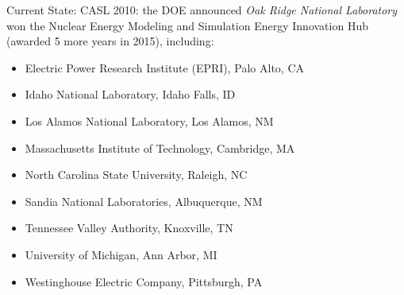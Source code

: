 \documentclass[xcolor=x11names,compress, handout]{beamer}
\renewcommand{\(}{\begin{columns}}
\renewcommand{\)}{\end{columns}}
\newcommand{\<}[1]{\begin{column}{#1}}
\renewcommand{\>}{\end{column}}
\begin{document}
%
%


\begin{frame}{Current State: CASL}
2010: the DOE announced \emph{Oak Ridge National Laboratory} won the Nuclear Energy Modeling and Simulation Energy Innovation Hub (awarded 5 more years in 2015), including:	
\begin{itemize}
\item Electric Power Research Institute (EPRI), Palo Alto, CA
\item Idaho National Laboratory, Idaho Falls, ID
\item Los Alamos National Laboratory, Los Alamos, NM
\item Massachusetts Institute of Technology, Cambridge, MA
\item North Carolina State University, Raleigh, NC
\item Sandia National Laboratories, Albuquerque, NM
\item Tennessee Valley Authority, Knoxville, TN
\item University of Michigan, Ann Arbor, MI
\item Westinghouse Electric Company, Pittsburgh, PA
\end{itemize}
\end{frame}
\end{document}
